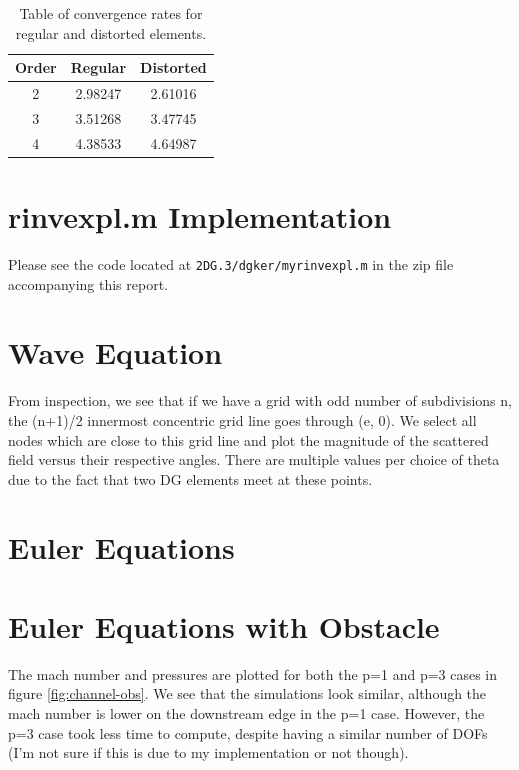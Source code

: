 \documentclass{article}
\begin{document}
\begin{table}[!ht]
\centering
\caption{Table of convergence rates for regular and distorted elements.}
\label{tbl:cc}
\begin{tabular}{c c c}
Order & Regular & Distorted \\
\midrule
2 & 2.98247 & 2.61016\\
3 & 3.51268 & 3.47745 \\
4 & 4.38533 & 4.64987 \\
\end{tabular}
\end{table}

\section{rinvexpl.m Implementation}
Please see the code located at \texttt{2DG.3/dgker/myrinvexpl.m} in the zip file accompanying this report.

\section{Wave Equation}
From inspection, we see that if we have a grid with odd number of subdivisions n, the (n+1)/2 innermost concentric grid line goes through (e, 0).
We select all nodes which are close to this grid line and plot the magnitude of the scattered field versus their respective angles.
There are multiple values per choice of theta due to the fact that two DG elements meet at these points.

\section{Euler Equations}

\section{Euler Equations with Obstacle}
The mach number and pressures are plotted for both the p=1 and p=3 cases in figure \ref{fig:channel-obs}.
We see that the simulations look similar, although the mach number is lower on the downstream edge in the p=1 case.
However, the p=3 case took less time to compute, despite having a similar number of DOFs (I'm not sure if this is due to my implementation or not though).
\end{document}
